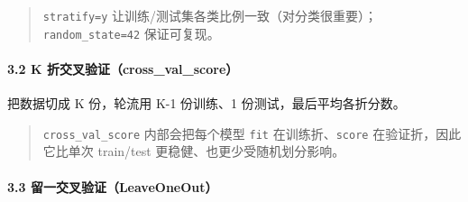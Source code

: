 \begin{quote}
\texttt{stratify=y}
让训练/测试集各类比例一致（对分类很重要）；\texttt{random\_state=42}
保证可复现。
\end{quote}

\paragraph{3.2 K
折交叉验证（cross\_val\_score）}\label{k-ux6298ux4ea4ux53c9ux9a8cux8bc1cross_val_score}

把数据切成 K 份，轮流用 K-1 份训练、1 份测试，最后平均各折分数。

\begin{Shaded}
\begin{Highlighting}[]

\OperatorTok{=}\OperatorTok{=}\NormalTok{)}
\OperatorTok{=}\OperatorTok{=}\NormalTok{)}
\NormalTok{(}\NormalTok{))}
\NormalTok{(}\NormalTok{, }\NormalTok{))}
\end{Highlighting}
\end{Shaded}

\begin{Shaded}
\begin{Highlighting}[]
\end{Highlighting}
\end{Shaded}

\begin{quote}
\texttt{cross\_val\_score} 内部会把每个模型 \texttt{fit}
在训练折、\texttt{score} 在验证折，因此它比单次 train/test
更稳健、也更少受随机划分影响。
\end{quote}

\paragraph{3.3
留一交叉验证（LeaveOneOut）}\label{ux7559ux4e00ux4ea4ux53c9ux9a8cux8bc1leaveoneout}

